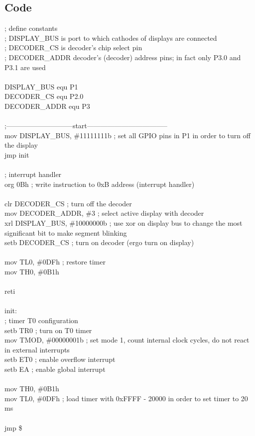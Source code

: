 \documentclass{article}
\begin{document}
\subsection{Code}
\ttfamily
; define constants\\
; DISPLAY\_BUS is port to which cathodes of displays are connected\\
; DECODER\_CS is decoder's chip select pin\\
; DECODER\_ADDR decoder's (decoder) address pins; in fact only P3.0 and P3.1 are used\\
\\
DISPLAY\_BUS     equ     P1\\
DECODER\_CS      equ     P2.0\\
DECODER\_ADDR    equ     P3\\
\\
;-----------------------------start-----------------------------------\\
    mov     DISPLAY\_BUS, \#11111111b ; set all GPIO pins in P1 in order to turn off the display\\
    jmp     init\\
\\
    ; interrupt handler\\
    org     0Bh                         ; write instruction to 0xB address (interrupt handler)\\
\\
    clr     DECODER\_CS                  ; turn off the decoder\\
    mov     DECODER\_ADDR, \#3            ; select active display with decoder\\
    xrl     DISPLAY\_BUS, \#10000000b     ; use xor on display bus to change the most significant bit to make segment blinking\\
    setb    DECODER\_CS                  ; turn on decoder (ergo turn on display)\\
\\
    mov     TL0, \#0DFh                   ; restore timer\\
    mov     TH0, \#0B1h\\
\\
    reti\\
    \\
init:\\
; timer T0 configuration\\
    setb    TR0                 ; turn on T0 timer\\
    mov     TMOD, \#00000001b    ; set mode 1, count internal clock cycles, do not react in external interrupts\\
    setb    ET0                 ; enable overflow interrupt\\
    setb    EA                  ; enable global interrupt\\
\\
    mov     TH0, \#0B1h\\
    mov     TL0, \#0DFh           ; load timer with 0xFFFF - 20000 in order to set timer to 20 ms\\
\\
    jmp     \$
\end{document}
